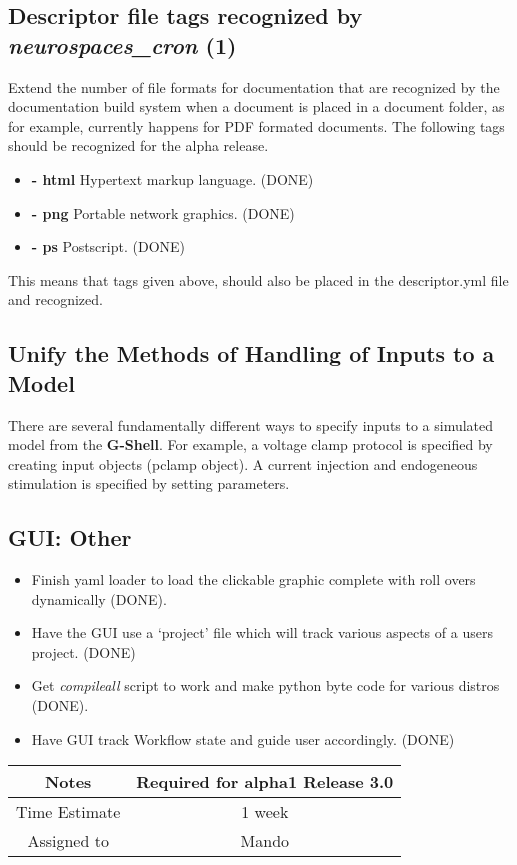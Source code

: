 \documentclass[12pt]{article}
\begin{document}
\subsection{Descriptor file tags recognized by {\it neurospaces\_cron} (1)}

Extend the number of file formats for documentation that are
recognized by the documentation build system when a document is placed
in a document folder, as for example, currently happens for PDF
formated documents. The following tags should be recognized for the
alpha release.
\begin{itemize}
   \item[]{\bf - html} Hypertext markup language. (DONE)
    \item[]{\bf - png} Portable network graphics. (DONE)
    \item[]{\bf - ps} Postscript. (DONE)
\end{itemize}
This means that tags given above, should also be placed in the
descriptor.yml file and recognized.

\subsection{Unify the Methods of Handling of Inputs to a Model}

There are several fundamentally different ways to specify inputs to a
simulated model from the {\bf G-Shell}.  For example, a voltage clamp
protocol is specified by creating input objects (pclamp object).  A
current injection and endogeneous stimulation is specified by setting
parameters.


\subsection{GUI: Other}
\begin{itemize}
\item Finish yaml loader to load the clickable graphic complete with
  roll overs dynamically (DONE).
\item Have the GUI use a `project' file which will track various
  aspects of a users project. (DONE)
\item Get {\it compileall} script to work and make python byte code for
  various distros (DONE).
\item Have GUI track Workflow state and guide user accordingly. (DONE)
\end{itemize}

{
  \vspace{5mm}
  \centering
  \begin{tabular}{|c|c|}
    \hline
    Notes
    & Required for alpha1 Release 3.0 \\
    \hline
    Time Estimate
    & 1 week \\
    \hline
    Assigned to
    & Mando \\
    \hline
  \end{tabular}
}
\end{document}
